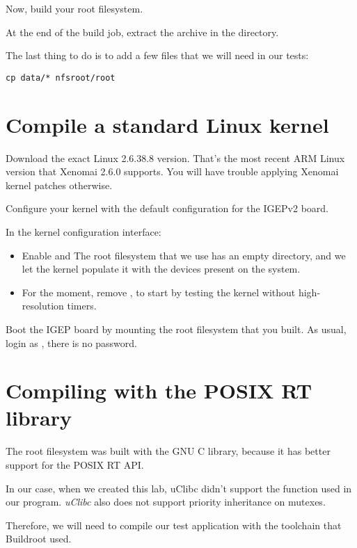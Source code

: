 Now, build your root filesystem.

At the end of the build job, extract the
 archive in the 
directory.

The last thing to do is to add a few files that we will need 
in our tests:

\begin{verbatim}
cp data/* nfsroot/root
\end{verbatim}

\section{Compile a standard Linux kernel}

Download the exact Linux 2.6.38.8 version. That's the most recent
ARM Linux version that Xenomai 2.6.0 supports. You will have trouble
applying Xenomai kernel patches otherwise.

Configure your kernel with the default configuration for the IGEPv2
board.

In the kernel configuration interface:
\begin{itemize}
\item Enable  and 
      The root filesystem that we use has an empty 
      directory, and we let the kernel populate it with the devices
      present on the system.
\item For the moment, remove ,
      to start by testing the kernel without high-resolution timers.
\end{itemize}

Boot the IGEP board by mounting the root filesystem that you built.
As usual, login as , there is no password.

\section{Compiling with the POSIX RT library}

The root filesystem was built with the GNU C library, because it has
better support for the POSIX RT API.

In our case, when we created this lab, uClibc
didn't support the  function used in our
 program. {\em uClibc} also does not support priority
inheritance on mutexes.

Therefore, we will need to compile our test application with the
toolchain that Buildroot used.

